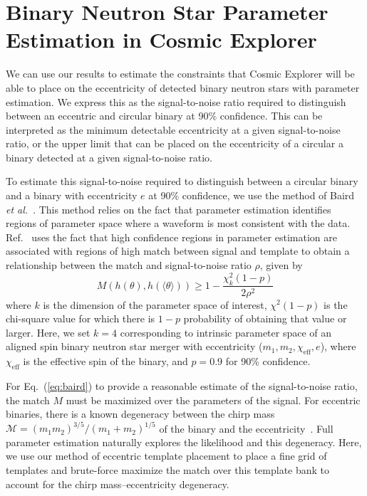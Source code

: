 \section{\label{s:3G-pe}Binary Neutron Star Parameter Estimation in Cosmic Explorer}

We can use our results to estimate the constraints that Cosmic Explorer will be able to place on the eccentricity of detected binary neutron stars with parameter estimation. We express this as the signal-to-noise ratio required to distinguish between an eccentric and circular binary at 90\% confidence. This can be interpreted as the minimum detectable eccentricity at a given signal-to-noise ratio, or the upper limit that can be placed on the eccentricity of a circular a binary detected at a given signal-to-noise ratio.

To estimate this signal-to-noise required to distinguish between a circular binary and a binary with eccentricity $e$ at 90\% confidence, we use the method of Baird {\it et al.}~\cite{Baird:2012cu}. This method relies on the fact that parameter estimation identifies regions of parameter space where a waveform is most consistent with the data. Ref.~\cite{Baird:2012cu} uses the fact that high confidence regions in parameter estimation are associated with regions of high match between signal and template to obtain a relationship between the match and signal-to-noise ratio $\rho$, given by
\begin{equation}
    M(h(\theta),h(\langle\theta\rangle)) \geq 1 - \frac{\chi_k^2(1-p)}{2\rho^2}
    \label{eq:baird}
\end{equation}
where $k$ is the dimension of the parameter space of interest, $\chi^2(1 - p)$ is the chi-square value for which there is $1 - p$ probability of obtaining that value or larger. Here, we set $k=4$ corresponding to intrinsic parameter space of an aligned spin binary neutron star merger with eccentricity ($m_1, m_2, \chi_\mathrm{eff}, e$), where $\chi_\mathrm{eff}$ is the effective spin of the binary, and $p = 0.9$ for 90\% confidence.

For Eq.~(\ref{eq:baird}) to provide a reasonable estimate of the signal-to-noise ratio, the match $M$ must be maximized over the parameters of the signal. For eccentric binaries, there is a known degeneracy between the chirp mass $\mathcal{M} = (m_1  m_2)^{3/5} / (m_1 + m_2)^{1/5}$ of the binary and the eccentricity~\cite{Martel:1999tm,Lenon:2020oza}. Full parameter estimation naturally explores the likelihood and this degeneracy. Here, we use our method of eccentric template placement to place a fine grid of templates and brute-force maximize the match over this template bank to account for the chirp mass--eccentricity degeneracy.

